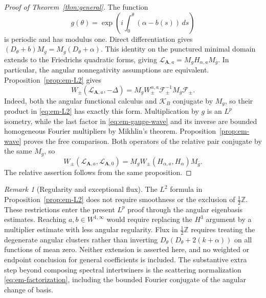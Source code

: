 \documentclass[11pt,a4paper,reqno,backref=page]{amsart}
\newcommand{\Z}{\mathbb Z}
\numberwithin{equation}{section}
\theoremstyle{definition}
\theoremstyle{remark}
\newtheorem{remark}[theorem]{Remark}
\begin{document}
\begin{proof}[Proof of Theorem~\ref{thm:general}]
  The function
  \begin{equation*}
    g(\theta)=\exp\left(i\int_0^\theta
    (\alpha-b(s))\,ds\right)
  \end{equation*}
  is periodic and has modulus one. Direct differentiation
  gives $(D_\theta+b)M_g=M_g(D_\theta+\alpha)$. This identity
  on the punctured minimal domain extends to the Friedrichs
  quadratic forms, giving
  $\mathcal L_{\mathbf A,a}=M_gH_{\alpha,a}M_{\bar g}$.
  In particular, the angular nonnegativity assumptions are
  equivalent. Proposition~\ref{prop:em-L2} gives
  \begin{equation}\label{eq:em-gauge-wave}
    W_\pm(\mathcal L_{\mathbf A,a},-\Delta)
    =M_gW_\pm^{\alpha,a}
    \mathcal F_\pm^{-1}M_{\bar g}\mathcal F_\pm.
  \end{equation}
  Indeed, both the angular functional calculus and
  $\mathcal K_B$ conjugate by $M_g$, so their product in
  \eqref{eq:em-L2} has exactly this form.
  Multiplication by $g$ is an $L^p$ isometry, while the last
  factor in \eqref{eq:em-gauge-wave} and its inverse are
  bounded homogeneous Fourier multipliers by Mikhlin's
  theorem. Proposition~\ref{prop:em-wave} proves the free
  comparison.
  Both operators of the relative pair conjugate by the same
  $M_g$, so
  \begin{equation*}
    W_\pm(\mathcal L_{\mathbf A,a},\mathcal L_{\mathbf A,0})
    =M_g W_\pm(H_{\alpha,a},H_\alpha)M_{\bar g}.
  \end{equation*}
  The relative assertion follows from the same proposition.
\end{proof}

\begin{remark}[Regularity and exceptional flux]
\label{rem:em-scope}
  The $L^2$ formula in Proposition~\ref{prop:em-L2} does not
  require smoothness or the exclusion of $\frac12\Z$.
  These restrictions enter the present $L^p$ proof through
  the angular eigenbasis estimates. Reaching
  $a,b\in W^{1,\infty}$ would require replacing the $H^3$
  argument by a multiplier estimate with less angular
  regularity. Flux in $\frac12\Z$ requires treating the
  degenerate angular clusters rather than inverting
  $D_\theta(D_\theta+2(k+\alpha))$ on all functions of mean
  zero. Neither extension is asserted here, and no weighted
  or endpoint conclusion for general coefficients is
  included. The substantive extra step beyond composing
  spectral intertwiners is the scattering normalization
  \eqref{eq:em-factorization}, including the bounded Fourier
  conjugate of the angular change of basis.
\end{remark}
\end{document}
